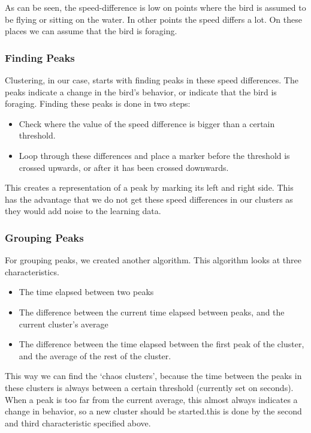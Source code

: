 
As can be seen, the speed-difference is low on points where the bird is assumed
to be flying or sitting on the water. In other points the speed differs a lot.
On these places we can assume that the bird is foraging.


\subsubsection{Finding Peaks}
 Clustering, in our case, starts with finding peaks in these speed differences.
 The peaks indicate a change in the bird's behavior, or indicate that the bird
 is foraging. Finding these peaks is done in two steps:

 \begin{itemize}
    \item Check where the value of the speed difference is bigger than a certain
    threshold.
    \item Loop through these differences and place a marker before the threshold
    is crossed upwards, or after it has been crossed downwards. 
 \end{itemize}
 
 This creates a representation of a peak by marking its left and right side.
 This has the advantage that we do not get these speed differences in our
 clusters as they would add noise to the learning data.

 \subsubsection{Grouping Peaks}
 For grouping peaks, we created another algorithm. This algorithm looks at three
 characteristics.  
 \begin{itemize}
 \item The time elapsed between two peaks
 \item The difference between the current time elapsed between peaks, and the
 current cluster's average
 \item The difference between the time elapsed between the first peak of the
 cluster, and the average of the rest of the cluster.
 \end{itemize}
 This way we can find the `chaos clusters', because the time between the peaks
 in these clusters is always between a certain threshold (currently set on
 \timeThreshold seconds). 
 When a peak is too far from the  current average, this almost always indicates
 a change in behavior, so a new cluster should be started.this is done by the
 second and third characteristic specified above.

